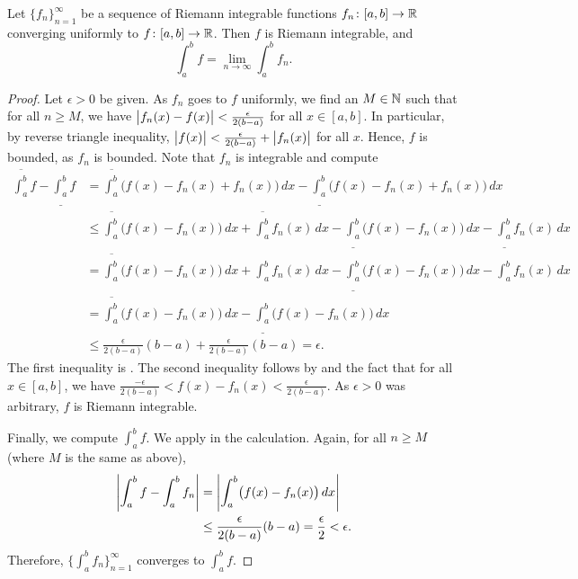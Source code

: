 \begin{thm} \label{integralinterchange:thm}
Let $\{ f_n \}_{n=1}^\infty$ be a sequence of Riemann integrable
functions
$f_n \colon [a,b] \to {\mathbb{R}}$
converging uniformly to $f \colon [a,b]
\to {\mathbb{R}}$.  Then $f$ is Riemann integrable, and
\begin{equation*}
\int_a^b f = \lim_{n\to\infty} \int_a^b f_n .
\end{equation*}
\end{thm}

\begin{proof}
Let $\epsilon > 0$ be given.
As $f_n$ goes to $f$ uniformly, we find an $M \in {\mathbb{N}}$ such that
for all $n \geq M$, we have 
$\bigl\lvert {f_n(x)-f(x)} \bigr\rvert < \frac{\epsilon}{2(b-a)}$ for all $x \in [a,b]$.
In particular, by reverse triangle inequality,
$\bigl\lvert {f(x)} \bigr\rvert < \frac{\epsilon}{2(b-a)} + \bigl\lvert {f_n(x)} \bigr\rvert$ for all $x$.
Hence, $f$ is bounded,
as $f_n$ is bounded.
Note that $f_n$ is integrable and compute
\begin{equation*}
\begin{split}
\overline{\int_a^b} f
-
\underline{\int_a^b} f
& =
\overline{\int_a^b} \bigl( f(x) - f_n(x) + f_n(x) \bigr)\,dx
-
\underline{\int_a^b} \bigl( f(x) - f_n(x) + f_n(x) \bigr)\,dx
\\
& \leq
\overline{\int_a^b} \bigl( f(x) - f_n(x) \bigr)\,dx +  \overline{\int_a^b} f_n(x) \,dx
-
\underline{\int_a^b} \bigl( f(x) - f_n(x) \bigr)\,dx -  \underline{\int_a^b} f_n(x) \,dx
\\
& =
\overline{\int_a^b} \bigl( f(x) - f_n(x) \bigr)\,dx +  \int_a^b f_n(x) \,dx
-
\underline{\int_a^b} \bigl( f(x) - f_n(x) \bigr)\,dx -  \int_a^b f_n(x) \,dx
\\
& =
\overline{\int_a^b} \bigl( f(x) - f_n(x) \bigr)\,dx
-
\underline{\int_a^b} \bigl( f(x) - f_n(x) \bigr)\,dx
\\
& \leq
\frac{\epsilon}{2(b-a)} (b-a) + 
\frac{\epsilon}{2(b-a)} (b-a) = \epsilon .
\end{split}
\end{equation*}
The first inequality is .
The second inequality follows by  and 
the fact that for all $x \in [a,b]$, we have
$\frac{-\epsilon}{2(b-a)} < f(x)-f_n(x) < \frac{\epsilon}{2(b-a)}$.
As $\epsilon > 0$ was arbitrary, $f$ is Riemann integrable.

Finally, we compute $\int_a^b f$.  We apply 
in the calculation.  Again, for all $n \geq M$ (where $M$ is the same as above),
\begin{equation*}
\begin{split}
\left\lvert {\int_a^b f - \int_a^b f_n} \right\rvert & = 
\left\lvert { \int_a^b \bigl(f(x) - f_n(x)\bigr)\,dx} \right\rvert
\\
& \leq
\frac{\epsilon}{2(b-a)} (b-a) = \frac{\epsilon}{2} < \epsilon .
\end{split}
\end{equation*}
Therefore, $\bigl\{ \int_a^b f_n \bigr\}_{n=1}^\infty$ converges to $\int_a^b f$.
\end{proof}

